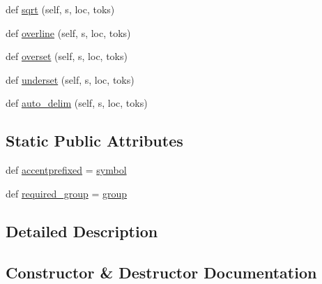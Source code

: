 \begin{DoxyCompactItemize}
\item 
def \hyperlink{classmatplotlib_1_1__mathtext_1_1Parser_acb0fb57ead9fd031ab31c3b441d21f61}{sqrt} (self, s, loc, toks)
\item 
def \hyperlink{classmatplotlib_1_1__mathtext_1_1Parser_acbf5174d83299d7f906bd9a16ef24c87}{overline} (self, s, loc, toks)
\item 
def \hyperlink{classmatplotlib_1_1__mathtext_1_1Parser_a73b628352fae93c32349905e63e9b597}{overset} (self, s, loc, toks)
\item 
def \hyperlink{classmatplotlib_1_1__mathtext_1_1Parser_a9029033446d4e297aea5b4b7055d60f2}{underset} (self, s, loc, toks)
\item 
def \hyperlink{classmatplotlib_1_1__mathtext_1_1Parser_a9334fb0f372910fd02997e61bc1f7167}{auto\+\_\+delim} (self, s, loc, toks)
\end{DoxyCompactItemize}
\subsection*{Static Public Attributes}
\begin{DoxyCompactItemize}
\item 
def \hyperlink{classmatplotlib_1_1__mathtext_1_1Parser_ac08dd6ca399fed434fc27e212a550a60}{accentprefixed} = \hyperlink{classmatplotlib_1_1__mathtext_1_1Parser_a8bf398e32270eb62b58dc669fb32449d}{symbol}
\item 
def \hyperlink{classmatplotlib_1_1__mathtext_1_1Parser_a8c0783ef9a58253a6a30385eaf401659}{required\+\_\+group} = \hyperlink{classmatplotlib_1_1__mathtext_1_1Parser_ace87af37200466779f925c78cd9bab49}{group}
\end{DoxyCompactItemize}


\subsection{Detailed Description}
 

\subsection{Constructor \& Destructor Documentation}
\mbox{\label{classmatplotlib_1_1__mathtext_1_1Parser_a5cf498317e985c1b4cf16544b1ba65f1}} 
